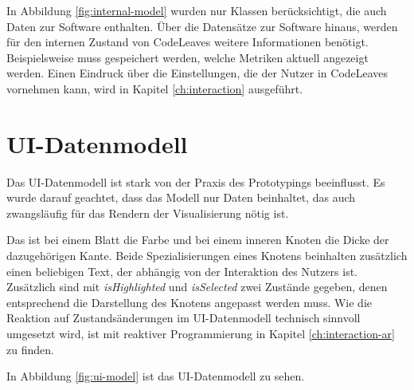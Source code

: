 In Abbildung \ref{fig:internal-model} wurden nur Klassen berücksichtigt, die auch Daten zur Software enthalten. Über die Datensätze zur Software hinaus, werden für den internen Zustand von CodeLeaves weitere Informationen benötigt. Beispielsweise muss gespeichert werden, welche Metriken aktuell angezeigt werden. Einen Eindruck über die Einstellungen, die der Nutzer in CodeLeaves vornehmen kann, wird in Kapitel \ref{ch:interaction} ausgeführt.

\section{UI-Datenmodell}
\label{sec:hierarchical-model}

Das UI-Datenmodell ist stark von der Praxis des Prototypings beeinflusst. Es wurde darauf geachtet, dass das Modell nur Daten beinhaltet, das auch zwangsläufig für das Rendern der Visualisierung nötig ist.

Das ist bei einem Blatt die Farbe und bei einem inneren Knoten die Dicke der dazugehörigen Kante. Beide Spezialisierungen eines Knotens beinhalten zusätzlich einen beliebigen Text, der abhängig von der Interaktion des Nutzers ist. Zusätzlich sind mit \textit{isHighlighted} und \textit{isSelected} zwei Zustände gegeben, denen entsprechend die Darstellung des Knotens angepasst werden muss. Wie die Reaktion auf Zustandsänderungen im UI-Datenmodell technisch sinnvoll umgesetzt wird, ist mit reaktiver Programmierung in Kapitel \ref{ch:interaction-ar} zu finden.

In Abbildung \ref{fig:ui-model} ist das UI-Datenmodell zu sehen.


